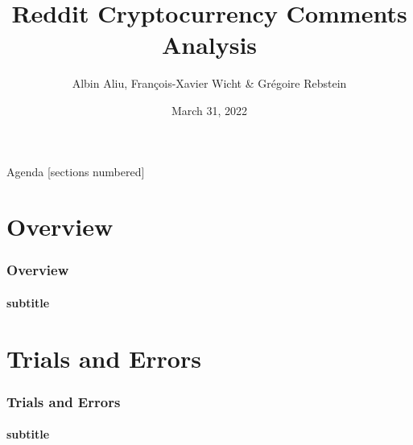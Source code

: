 \documentclass[aspectratio=169]{beamer}
\title{Reddit Cryptocurrency Comments Analysis}
\date{March 31, 2022}
\author{Albin Aliu, François-Xavier Wicht \& Grégoire Rebstein}
\institute{Social Media Analytics}
\begin{document}
\maketitle

\begin{frame}{Agenda}
    [sections numbered]
    \tableofcontents
\end{frame}
\section{Overview}
\begin{frame}[t]
    \frametitle{Overview}
    \framesubtitle{subtitle}
\end{frame}
\section{Trials and Errors}
\begin{frame}[t]
    \frametitle{Trials and Errors}
    \framesubtitle{subtitle}
\end{frame}
\end{document}
